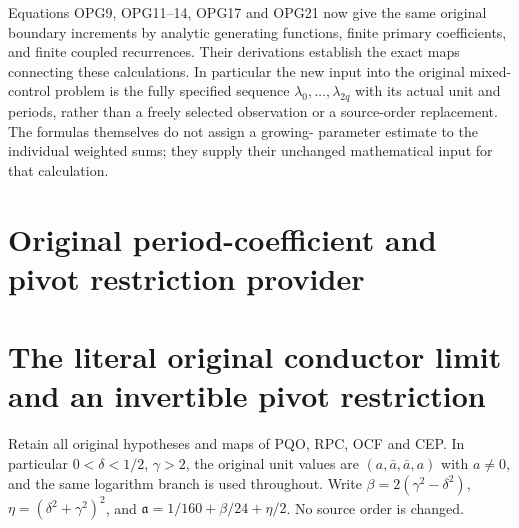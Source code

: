 Equations OPG9, OPG11--14, OPG17 and OPG21 now give the same
original boundary increments by analytic generating functions,
finite primary coefficients, and finite coupled recurrences.
Their derivations establish the exact maps connecting these
calculations. In particular the new input into the original
mixed-control problem is the fully specified sequence
$\lambda_0,\ldots,\lambda_{2q}$ with its actual unit and periods,
rather than a freely selected observation or a source-order
replacement. The formulas themselves do not assign a growing-
parameter estimate to the individual weighted sums; they supply
their unchanged mathematical input for that calculation.


\endgroup

\clearpage
\begingroup


\setcounter{equation}{0}
\renewcommand{\theequation}{PCL.\arabic{equation}}
\section*{Original period-coefficient and pivot restriction provider}
\section{The literal original conductor limit and an invertible pivot restriction}
\label{pcl:sec:PCL}
Retain all original hypotheses and maps of PQO, RPC, OCF and CEP.
In particular $0<\delta<1/2$, $\gamma>2$, the original unit values
are $(a,\bar a,\bar a,a)$ with $a\ne0$, and the same logarithm
branch is used throughout. Write $\beta=2(\gamma^2-\delta^2)$,
$\eta=(\delta^2+\gamma^2)^2$, and
$\mathfrak a=1/160+\beta/24+\eta/2$. No source order is changed.

